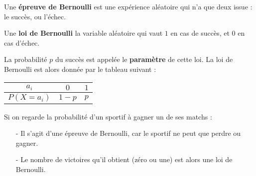 \documentclass[10pt]{beamer}
\begin{document}
\begin{frame}
	\begin{definition}
		\vspace*{-0.5em}Une \textbf{épreuve de Bernoulli} est une expérience aléatoire qui n'a que deux issue : le succès, ou l'échec.
	\end{definition}

	\begin{definition}
		\vspace*{-0.5em}Une \textbf{loi de Bernoulli} la variable aléatoire qui vaut $1$ en cas de succès, et $0$ en cas d'échec.

		La probabilité $p$ du succès est appelée le \textbf{paramètre} de cette loi. La loi de Bernoulli est alors donnée par le tableau suivant :
		\begin{center}
			\begin{tabular}{|c|c|c|}
				\hline
				$a_i$        & $0$     & $1$ \\ \hline
				$P(X = a_i)$ & $1 - p$ & $p$ \\ \hline
			\end{tabular}
		\end{center}
	\end{definition}

	\begin{exemple}
		Si on regarde la probabilité d'un sportif à gagner un de ses matchs :
		\vspace*{-1.2em}\begin{itemize}
			\item[-] Il s'agit d'une épreuve de Bernoulli, car le sportif ne peut que perdre ou gagner.
			\item[-] Le nombre de victoires qu'il obtient (zéro ou une) est alors une loi de Bernoulli.
		\end{itemize}
	\end{exemple}
\end{frame}
\end{document}
